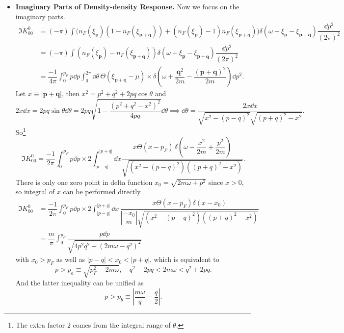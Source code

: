\documentclass[bachelor,english,numbers]{ustcthesis}
\begin{document}
\begin{itemize}
			\item  {\bf Imaginary Parts of Density-density Response.}
				Now we focus on the imaginary parts.
				\begin{align}
					\Im K^0_{00}&=(-\pi)\int\bigg(n_F(\xi_{\bm{p}})(1-n_F(\xi_{\bm{p+q}}))+(n_F(\xi_{\bm{p}})-1)n_F(\xi_{\bm{p+q}})\bigg)\delta(\omega+\xi_{\bm{p}}-\xi_{\bm{p+q}})\dfrac{\dd p^2}{(2\pi)^2}\nonumber\\
					&=(-\pi)\int (n_F(\xi_{\bm{p}})-n_F(\xi_{\bm{p+q}}))\delta(\omega+\xi_{\bm{p}}-\xi_{\bm{p+q}})\dfrac{\dd p^2}{(2\pi)^2}\nonumber\\
					&=\dfrac{-1}{4\pi}\int_0^{p_F} p\dd p\int_0^{2\pi}\dd\theta\,\varTheta(\xi_{\bm{p+q}}-\mu)\times\delta\left(\omega+\dfrac{\bm{q}^2}{2m}-\dfrac{(\bm{p+q})^2}{2m}\right)\dd p^2.\label{3.2.9}
				\end{align}
				Let $x\equiv|\bm{p+q}|$, then $x^2=p^2+q^2+2pq\cos\theta$ and 
				\begin{equation*}
					2x\dd x=2pq\sin\theta\dd\theta=2pq\sqrt{1-\dfrac{(p^2+q^2-x^2)^2}{4pq}}\dd\theta\implies\dd\theta=\dfrac{2x\dd x}{\sqrt{x^2-(p-q)^2}\sqrt{(p+q)^2-x^2}}.
				\end{equation*}
				So\footnote{The extra factor $2$ comes from the integral range of $\theta$.}
				\begin{equation*}
					\Im K^0_{00}=\dfrac{-1}{2\pi}\int_0^{p_F}p\dd p\times 2\int_{|p-q|}^{|p+q|}\dd x\dfrac{x\varTheta(x-p_F)\,\delta\left(\omega-\dfrac{x^2}{2m}+\dfrac{p^2}{2m}\right)}{\sqrt{(x^2-(p-q)^2)((p+q)^2-x^2)}}.
				\end{equation*}
				There is only one zero point in delta function $x_0=\sqrt{2m\omega+p^2}$ since $x>0$, so integral of $x$ can be performed directly
				\begin{align}
					\Im K^0_{00}&=\dfrac{-1}{2\pi}\int_0^{p_F}p\dd p\times 2\int_{|p-q|}^{|p+q|}\dd x\,\dfrac{x\varTheta(x-p_F)\delta(x-x_0)}{\left|\dfrac{-x_0}{m}\right|\sqrt{(x^2-(p-q)^2)((p+q)^2-x^2)}}\nonumber\\
					&=\dfrac{m}{\pi}\int_0^{p_F}\dfrac{p\dd p}{\sqrt{4p^2q^2-(2m\omega-q^2)^2}}\label{3.2.10}
				\end{align}
				with $x_0>p_F$ as well as $|p-q|<x_0<|p+q|$, which is equivalent to
				\begin{equation*}
					p>p_a\equiv\sqrt{p_F^2-2m\omega},\quad q^2-2pq<2m\omega<q^2+2pq.
				\end{equation*}
				And the latter inequality can be unified as
				\begin{equation*}
					p>p_b\equiv\left|\dfrac{m\omega}{q}-\dfrac{q}{2}\right|.

\end{equation*}
\end{itemize}
\end{document}
